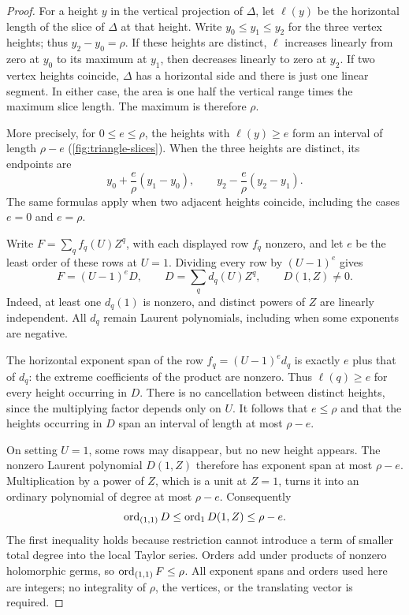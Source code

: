 \begin{proof}
For a height $y$ in the vertical projection of $\Delta$, let $\ell(y)$ be the horizontal length of the slice of $\Delta$ at that height.  Write $y_0\leq y_1\leq y_2$ for the three vertex heights; thus $y_2-y_0=\rho$.  If these heights are distinct, $\ell$ increases linearly from zero at $y_0$ to its maximum at $y_1$, then decreases linearly to zero at $y_2$.  If two vertex heights coincide, $\Delta$ has a horizontal side and there is just one linear segment.  In either case, the area is one half the vertical range times the maximum slice length.  The maximum is therefore $\rho$.

More precisely, for $0\leq e\leq\rho$, the heights with $\ell(y)\geq e$ form an interval of length $\rho-e$ (\cref{fig:triangle-slices}).  When the three heights are distinct, its endpoints are
\[
 y_0+\frac e\rho(y_1-y_0),
 \qquad
 y_2-\frac e\rho(y_2-y_1).
\]
The same formulas apply when two adjacent heights coincide, including the cases $e=0$ and $e=\rho$.

Write $F=\sum_q f_q(U)Z^q$, with each displayed row $f_q$ nonzero, and let $e$ be the least order of these rows at $U=1$.  Dividing every row by $(U-1)^e$ gives
\[
 F=(U-1)^eD,
 \qquad D=\sum_q d_q(U)Z^q,
 \qquad D(1,Z)\ne0.
\]
Indeed, at least one $d_q(1)$ is nonzero, and distinct powers of $Z$ are linearly independent.  All $d_q$ remain Laurent polynomials, including when some exponents are negative.

The horizontal exponent span of the row $f_q=(U-1)^e d_q$ is exactly $e$ plus that of $d_q$: the extreme coefficients of the product are nonzero.  Thus $\ell(q)\geq e$ for every height occurring in $D$.  There is no cancellation between distinct heights, since the multiplying factor depends only on $U$.  It follows that $e\leq\rho$ and that the heights occurring in $D$ span an interval of length at most $\rho-e$.

On setting $U=1$, some rows may disappear, but no new height appears. The nonzero Laurent polynomial $D(1,Z)$ therefore has exponent span at most $\rho-e$.  Multiplication by a power of $Z$, which is a unit at $Z=1$, turns it into an ordinary polynomial of degree at most $\rho-e$.  Consequently
\[
 \operatorname{ord}_{(1,1)}D
 \leq \operatorname{ord}_1 D(1,Z)
 \leq \rho-e.
\]
The first inequality holds because restriction cannot introduce a term of smaller total degree into the local Taylor series.  Orders add under products of nonzero holomorphic germs, so $\operatorname{ord}_{(1,1)}F\leq\rho$. All exponent spans and orders used here are integers; no integrality of $\rho$, the vertices, or the translating vector is required.
\end{proof}


